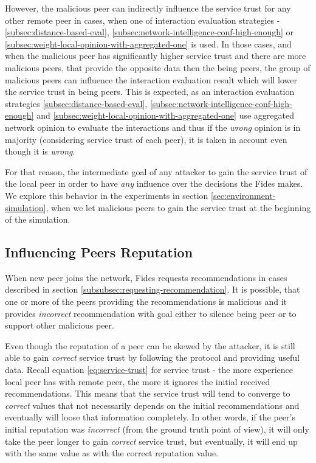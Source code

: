 However, the malicious peer can indirectly influence the service trust for any other remote peer in cases, when one of interaction evaluation strategies - \ref{subsec:distance-based-eval}, \ref{subsec:network-intelligence-conf-high-enough} or \ref{subsec:weight-local-opinion-with-aggregated-one} is used.
In those cases, and when the malicious peer has significantly higher service trust and there are more malicious peers, that provide the opposite data then the being peers, the group of malicious peers can influence the interaction evaluation result which will lower the service trust in being peers.
This is expected, as an interaction evaluation strategies \ref{subsec:distance-based-eval}, \ref{subsec:network-intelligence-conf-high-enough} and \ref{subsec:weight-local-opinion-with-aggregated-one} use aggregated network opinion to evaluate the interactions and thus if the \textit{wrong} opinion is in majority (considering service trust of each peer), it is taken in account even though it is \textit{wrong}.

For that reason, the intermediate goal of any attacker to gain the service trust of the local peer in order to have \textit{any} influence over the decisions the Fides makes.
We explore this behavior in the experiments in section \ref{sec:environment-simulation}, when we let malicious peers to gain the service trust at the beginning of the simulation.

\subsection{Influencing Peers Reputation}
\label{subsec:influencing-peers-reputation}
When new peer joins the network, Fides requests recommendations in cases described in section \ref{subsubsec:requesting-recommendation}.
It is possible, that one or more of the peers providing the recommendations is malicious and it provides \textit{incorrect} recommendation with goal either to silence being peer or to support other malicious peer.

Even though the reputation of a peer can be skewed by the attacker, it is still able to gain \textit{correct} service trust by following the protocol and providing useful data.
Recall equation \ref{eq:service-trust} for service trust - the more experience local peer has with remote peer, the more it ignores the initial received recommendations.
This means that the service trust will tend to converge to \textit{correct} values that not necessarily depends on the initial recommendations and eventually will loose that information completely.
In other words, if the peer's initial reputation was \textit{incorrect} (from the ground truth point of view), it will only take the peer longer to gain \textit{correct} service trust, but eventually, it will end up with the same value as with the correct reputation value.

